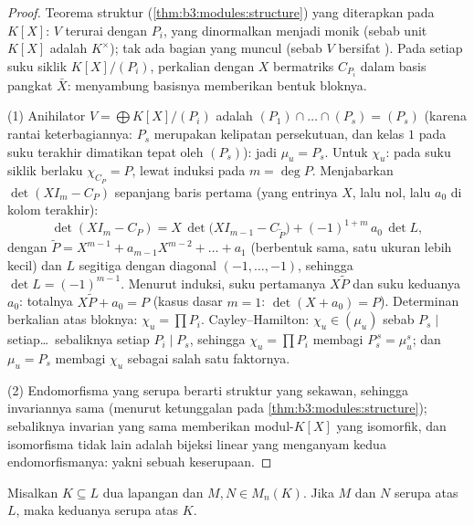\begin{proof}
Teorema struktur (\cref{thm:b3:modules:structure}) yang diterapkan
pada  $K[X]$:  $V$ terurai dengan
 $P_i$, yang dinormalkan menjadi monik (sebab unit $K[X]$ adalah
$K^\times$); tak ada bagian  yang muncul (sebab $V$ bersifat ). Pada setiap suku
siklik $K[X]/(P_i)$, perkalian dengan $X$ bermatriks $C_{P_i}$
dalam basis pangkat $\bar X$: menyambung basisnya memberikan
bentuk bloknya.

(1) Anihilator $V = \bigoplus K[X]/(P_i)$ adalah $(P_1)\cap
\dots\cap(P_s) = (P_s)$ (karena rantai keterbagiannya: $P_s$ merupakan kelipatan
persekutuan, dan kelas $1$ pada suku terakhir dimatikan
tepat oleh $(P_s)$): jadi $\mu_u = P_s$. Untuk $\chi_u$: pada suku
siklik berlaku $\chi_{C_P} = P$, lewat induksi pada $m = \deg P$. Menjabarkan
$\det(XI_m - C_P)$ sepanjang baris pertama (yang entrinya $X$, lalu
nol, lalu $a_0$ di kolom terakhir):
\[
\det(XI_m - C_P) = X\,\det\bigl(XI_{m-1} - C_{\tilde P}\bigr)
+ (-1)^{1+m}\,a_0\,\det L ,
\]
dengan $\tilde P = X^{m-1} + a_{m-1}X^{m-2} + \dots + a_1$ (berbentuk
sama, satu ukuran lebih kecil) dan $L$ segitiga dengan diagonal
$(-1, \dots, -1)$, sehingga $\det L = (-1)^{m-1}$. Menurut induksi, suku
pertamanya $X\tilde P$ dan suku keduanya $a_0$: totalnya
$X\tilde P + a_0 = P$ (kasus dasar $m=1$: $\det(X + a_0) = P$).
Determinan berkalian atas bloknya:
$\chi_u = \prod P_i$. Cayley--Hamilton: $\chi_u \in (\mu_u)$
sebab $P_s \mid$ setiap\dots\ sebaliknya setiap $P_i \mid P_s$, sehingga
$\chi_u = \prod P_i$ membagi $P_s^{\,s} = \mu_u^s$; dan $\mu_u =
P_s$ membagi $\chi_u$ sebagai salah satu faktornya.

(2) Endomorfisma yang serupa berarti struktur  yang sekawan, sehingga
invariannya sama (menurut ketunggalan pada
\cref{thm:b3:modules:structure}); sebaliknya invarian yang sama
memberikan modul-$K[X]$ yang isomorfik, dan isomorfisma 
tidak lain adalah bijeksi linear yang menganyam kedua endomorfismanya: yakni
sebuah keserupaan.
\end{proof}

\begin{corollary}
\label{cor:b3:modules:descent}
Misalkan $K \subseteq L$ dua lapangan dan $M, N \in M_n(K)$. Jika $M$ dan
$N$ serupa atas $L$, maka keduanya serupa atas $K$.
\end{corollary}

